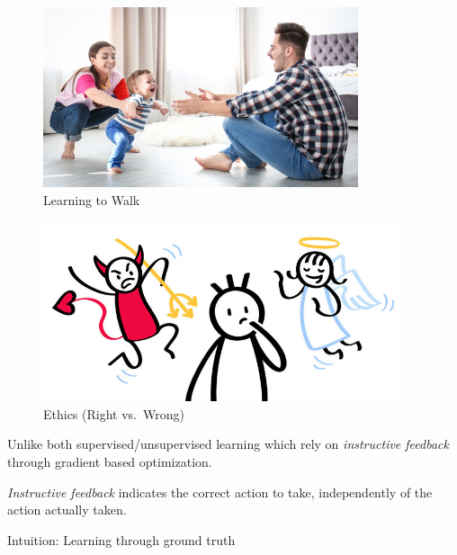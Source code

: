 \documentclass[
  letterpaper,
  DIV=11,
  numbers=noendperiod]{scrreprt}
\begin{document}
\begin{figure}[H]

{\centering \includegraphics[width=1\linewidth,height=2.08333in]{lecture1/images/BabyWalking.jpg}

}

\caption{Learning to Walk}

\end{figure}%

\begin{figure}[H]

{\centering \includegraphics[width=1\linewidth,height=2.08333in]{lecture1/images/ethics.jpg}

}

\caption{Ethics (Right vs.~Wrong)}

\end{figure}%

Unlike both supervised/unsupervised learning which rely on
\emph{instructive feedback} through gradient based optimization.

\begin{tcolorbox}[enhanced jigsaw, toprule=.15mm, leftrule=.75mm, coltitle=black, left=2mm, opacityback=0, titlerule=0mm, arc=.35mm, toptitle=1mm, opacitybacktitle=0.6, bottomtitle=1mm, colframe=quarto-callout-tip-color-frame, title=\textcolor{quarto-callout-tip-color}{\faLightbulb}\hspace{0.5em}{Instructive Feedback}, rightrule=.15mm, bottomrule=.15mm, colbacktitle=quarto-callout-tip-color!10!white, breakable, colback=white]

\emph{Instructive feedback} indicates the correct action to take,
independently of the action actually taken.

Intuition: Learning through ground truth

\end{tcolorbox}
\end{document}
